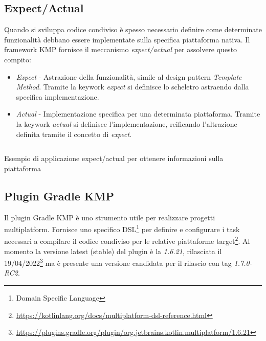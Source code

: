 \subsection{Expect/Actual}
Quando si sviluppa codice condiviso è spesso necessario definire come determinate funzionalità debbano essere implementate sulla specifica piattaforma nativa. Il framework KMP fornisce il meccanismo \textit{expect/actual} per assolvere questo compito:
\begin{itemize}
    \item \textit{Expect} - Astrazione della funzionalità, simile al design pattern \textit{Template Method}. Tramite la keywork \textit{expect} si definisce lo scheletro astraendo dalla specifica implementazione.
    \item \textit{Actual} - Implementazione specifica per una determinata piattaforma. Tramite la keywork \textit{actual} si definisce l'implementazione, reificando l'altrazione definita tramite il concetto di \textit{expect}.
\end{itemize}

\begin{listing}[H]
\inputminted{kotlin}{code/3-expectactual}
\caption{Esempio di applicazione expect/actual per ottenere informazioni sulla piattaforma}
\end{listing}

\subsection{Plugin Gradle KMP}
Il plugin Gradle KMP è uno strumento utile per realizzare progetti multiplatform. Fornisce uno specifico DSL\footnote{Domain Specific Language} per definire e configurare i task necessari a compilare il codice condiviso per le relative piattaforme target\footnote{\url{https://kotlinlang.org/docs/multiplatform-dsl-reference.html}}. Al momento la versione latest (stable) del plugin è la \textit{1.6.21}, rilasciata il 19/04/2022\footnote{\url{https://plugins.gradle.org/plugin/org.jetbrains.kotlin.multiplatform/1.6.21}} ma è presente una versione candidata per il rilascio con tag \textit{1.7.0-RC2}.

